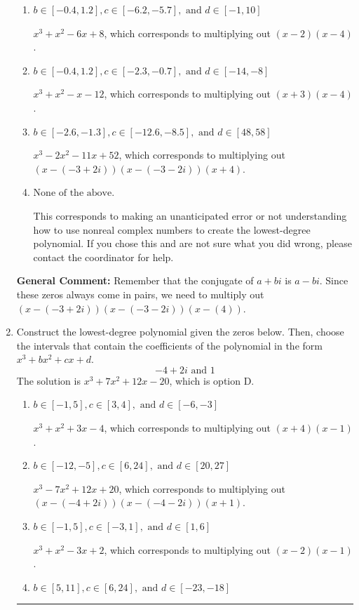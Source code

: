 \documentclass{extbook}[14pt]
\newcommand{\litem}[1]{\item #1

\rule{\textwidth}{0.4pt}}
\begin{document}
\begin{enumerate}
{\begin{enumerate}[label=\Alph*.]
* $x^{3} +2 x^{2} -11 x -52$, which is the correct option.
\item \( b \in [-0.4, 1.2], c \in [-6.2, -5.7], \text{ and } d \in [-1, 10] \)

$x^{3} + x^{2} -6 x + 8$, which corresponds to multiplying out $(x -2)(x -4)$.
\item \( b \in [-0.4, 1.2], c \in [-2.3, -0.7], \text{ and } d \in [-14, -8] \)

$x^{3} + x^{2} -x -12$, which corresponds to multiplying out $(x + 3)(x -4)$.
\item \( b \in [-2.6, -1.3], c \in [-12.6, -8.5], \text{ and } d \in [48, 58] \)

$x^{3} -2 x^{2} -11 x + 52$, which corresponds to multiplying out $(x-(-3 + 2 i))(x-(-3 - 2 i))(x + 4)$.
\item \( \text{None of the above.} \)

This corresponds to making an unanticipated error or not understanding how to use nonreal complex numbers to create the lowest-degree polynomial. If you chose this and are not sure what you did wrong, please contact the coordinator for help.
\end{enumerate}

\textbf{General Comment:} Remember that the conjugate of $a+bi$ is $a-bi$. Since these zeros always come in pairs, we need to multiply out $(x-(-3 + 2 i))(x-(-3 - 2 i))(x-(4))$.
}
\litem{
Construct the lowest-degree polynomial given the zeros below. Then, choose the intervals that contain the coefficients of the polynomial in the form $x^3+bx^2+cx+d$.
\[ -4 + 2 i \text{ and } 1 \]The solution is \( x^{3} +7 x^{2} +12 x -20 \), which is option D.\begin{enumerate}[label=\Alph*.]
\item \( b \in [-1, 5], c \in [3, 4], \text{ and } d \in [-6, -3] \)

$x^{3} + x^{2} +3 x -4$, which corresponds to multiplying out $(x + 4)(x -1)$.
\item \( b \in [-12, -5], c \in [6, 24], \text{ and } d \in [20, 27] \)

$x^{3} -7 x^{2} +12 x + 20$, which corresponds to multiplying out $(x-(-4 + 2 i))(x-(-4 - 2 i))(x + 1)$.
\item \( b \in [-1, 5], c \in [-3, 1], \text{ and } d \in [1, 6] \)

$x^{3} + x^{2} -3 x + 2$, which corresponds to multiplying out $(x -2)(x -1)$.
\item \( b \in [5, 11], c \in [6, 24], \text{ and } d \in [-23, -18] \)


\end{enumerate}}
\end{enumerate}
\end{document}
